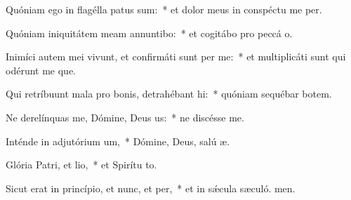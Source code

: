 \item Quóniam ego in flagélla patus sum:~* et dolor meus in conspéctu me per.
\item Quóniam iniquitátem meam annuntibo:~* et cogitábo pro peccá o.
\item Inimíci autem mei vivunt, et confirmáti sunt per me:~* et multiplicáti sunt qui odérunt me que.
\item Qui retríbuunt mala pro bonis, detrahébant hi:~* quóniam sequébar botem.
\item Ne derelínquas me, Dómine, Deus us:~* ne discésse  me.
\item Inténde in adjutórium um,~* Dómine, Deus, salú æ.
\item Glória Patri, et lio,~* et Spirítu to.
\item Sicut erat in princípio, et nunc, et per,~* et in sǽcula sæculó. men.

